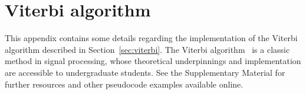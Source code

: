 \documentclass[paper-main.tex]{subfiles}
\begin{document}

\section{Viterbi algorithm}
\label{app:viterbi}
This appendix contains some details regarding the implementation of the Viterbi algorithm described in Section~\ref{sec:viterbi}. 
The Viterbi algorithm~\cite{Viterbi:1967} is a classic method in signal processing, whose theoretical underpinnings and implementation are accessible to undergraduate students. 
See the Supplementary Material for further resources and other pseudocode examples available online.
\end{document}

